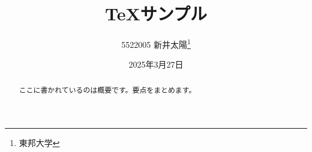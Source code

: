 \documentclass{jsarticle}
\title{TeXサンプル}
\author{5522005 新井太陽\thanks{東邦大学}}
\date{2025年3月27日}
\begin{document}
\maketitle

\begin{abstract}
ここに書かれているのは概要です。要点をまとめます。
\end{abstract}

\newpage
\tableofcontents






\end{document}
